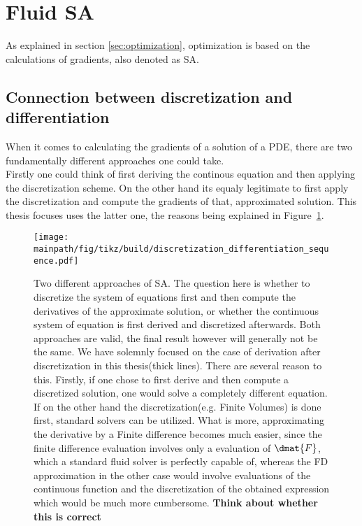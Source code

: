 \documentclass[../main.tex]{subfiles}
\begin{document}
\section{Fluid \acf{SA}}\label{sec:SA}
As explained in section \ref{sec:optimization}, optimization is based on the calculations of gradients, also denoted as \acf{SA}.

\subsection{Connection between discretization and differentiation}\label{sec:discretization_vs_differentiation}
When it comes to calculating the gradients of a solution of a PDE, there are two fundamentally different approaches one could take.\\
Firstly one could think of first deriving the continous equation and then applying the discretization scheme. On the other hand its equaly legitimate to first apply the discretization and compute the gradients of that, approximated solution. This thesis focuses uses the latter one, the reasons being explained in Figure~\ref{fig:discretization_differentiation_sequence}.


 \begin{figure}[h!]
	\begin{center}
        \texttt{[image: \\mainpath/fig/tikz/build/discretization\_differentiation\_sequence.pdf]}
        \caption[Sensitivity Analysis approaches]{Two different approaches of \ac{SA}. The question here is whether to discretize the system of equations first and then compute the derivatives of the approximate solution, or whether the continuous system of equation is first derived and discretized afterwards. Both approaches are valid, the final result however will generally not be the same. We have solemnly focused on the case of derivation after discretization in this thesis(thick lines). There are several reason to this. Firstly, if one chose to first derive and then compute a discretized solution, one would solve a completely different equation. If on the other hand the discretization(e.g. Finite Volumes) is done first, standard solvers can be utilized. What is more, approximating the derivative by a Finite difference becomes much easier, since the finite difference evaluation involves only a evaluation of $\dmat{F}$, which a standard fluid solver is perfectly capable of, whereas the \ac{FD} approximation in the other case would involve evaluations of the continuous function and the discretization of the obtained expression which would be much more cumbersome. \textbf{Think about whether this is correct} }
		\label{fig:discretization_differentiation_sequence}
    \end{center}
\end{figure}
\end{document}
